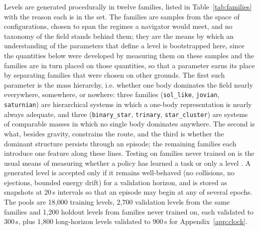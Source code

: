 \documentclass[11pt]{article}
\newcommand{\code}[1]{\texttt{\small #1}}
\begin{document}
Levels are generated procedurally in twelve families, listed in
Table~\ref{tab:families} with the reason each is in the set. The families
are samples from the space of configurations, chosen to span the regimes a
navigator would meet, and no taxonomy of the field stands behind them; they
are the means by which an understanding of the parameters that define a
level is bootstrapped here, since the quantities below were developed by
measuring them on these samples and the families are in turn placed on
those quantities, so that a parameter earns its place by separating
families that were chosen on other grounds. The first such parameter is the
mass hierarchy, i.e. whether one body dominates the field nearly everywhere,
somewhere, or nowhere: three families (\code{sol\_like}, \code{jovian},
\code{saturnian}) are hierarchical systems in which a one-body
representation is nearly always adequate, and three (\code{binary\_star},
\code{trinary}, \code{star\_cluster}) are systems of comparable masses in
which no single body dominates anywhere. The second is what, besides
gravity, constrains the route, and the third is whether the dominant
structure persists through an episode; the remaining families each
introduce one feature along these lines. Testing on families never trained on is the usual means of measuring
whether a policy has learned a task or only a level
\cite{cobbe2019,cobbe2020,justesen2018}. A generated level is accepted only
if it remains well-behaved (no collisions, no ejections, bounded energy
drift) for a validation horizon, and is stored as snapshots at 20\,s
intervals so that an episode may begin at any of several epochs. The pools are 18,000 training levels, 2,700
validation levels from the same families and 1,200 holdout levels from
families never trained on, each validated to 300\,s, plus 1,800
long-horizon levels validated to 900\,s for Appendix~\ref{app:clock}.
\end{document}
